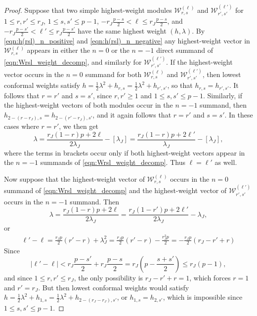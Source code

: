 \documentclass[11pt, reqno]{amsart}
\theoremstyle{definition}\newtheorem{defi}[thm]{Definition}
\theoremstyle{definition}\newtheorem{rem}[thm]{Remark}
\theoremstyle{definition}\newtheorem{exam}[thm]{Example}
\theoremstyle{definition}\newtheorem{assum}[thm]{Assumption}
\newcommand{\cW}{\mathcal{W}}
\begin{document}
\begin{proof}
Suppose that two simple highest-weight modules $\cW_{r,s}^{(\ell)}$ and $\cW_{r',s'}^{(\ell')}$ for $1\leq r,r'\leq r_J$, $1\leq s,s'\leq p-1$, $-r_J\frac{p-s}{2}<\ell\leq r_J\frac{p-s}{2}$, and $-r_J\frac{p-s'}{2}<\ell'\leq r_J\frac{p-s'}{2}$ have the same highest weight $(h,\lambda)$. By \eqref{eqn:h(rsl)_n_positive} and \eqref{eqn:h(rsl)_n_negative} any highest-weight vector in $\cW_{r,s}^{(\ell)}$ appears in either the $n=0$ or the $n=-1$ direct summand of \eqref{eqn:Wrsl_weight_decomp}, and similarly for $\cW_{r',s'}^{(\ell')}$. If the highest-weight vector occurs in the $n=0$ summand for both $\cW_{r,s}^{(\ell)}$ and $\cW_{r',s'}^{(\ell')}$, then lowest conformal weights satisfy $h=\frac{1}{2}\lambda^2+h_{r,s}=\frac{1}{2}\lambda^2+h_{r',s'}$, so that $h_{r,s}=h_{r',s'}$. It follows that $r=r'$ and $s=s'$, since $r,r'\geq 1$ and $1\leq s,s'\leq p-1$. Similarly, if the highest-weight vectors of both modules occur in the $n=-1$ summand, then $h_{2-(r-r_J),s}=h_{2-(r'-r_J),s'}$, and it again follows that $r=r'$ and $s=s'$. In these cases where $r=r'$, we then get
\begin{equation*}
\lambda =\frac{r_J(1-r)p+2\ell}{2\lambda_J}-[\lambda_J] = \frac{r_J(1-r)p+2\ell'}{\lambda_J}-[\lambda_J],
\end{equation*}
where the terms in brackets occur only if both highest-weight vectors appear in the $n=-1$ summands of \eqref{eqn:Wrsl_weight_decomp}. Thus $\ell=\ell'$ as well.

Now suppose that the highest-weight vector of $\cW_{r,s}^{(\ell)}$ occurs in the $n=0$ summand of \eqref{eqn:Wrsl_weight_decomp} and the highest-weight vector of $\cW_{r',s'}^{(\ell')}$ occurs in the $n=-1$ summand. Then
\begin{equation*}
\lambda=\frac{r_J(1-r)p+2\ell}{2\lambda_J}=\frac{r_J(1-r')p+2\ell'}{2\lambda_J}-\lambda_J,
\end{equation*}
or
\begin{align*}
\ell'-\ell = \frac{r_J p}{2}(r'-r)+\lambda_J^2 =\frac{r_J p}{2}(r'-r) -\frac{r_J^2 p}{2}=-\frac{r_J p}{2}(r_J-r'+r)
\end{align*}
Since
\begin{equation*}
\vert \ell'-\ell\vert < r_J\frac{p-s'}{2}+r_J\frac{p-s}{2} = r_J \left(p-\frac{s+s'}{2}\right)\leq r_J(p-1),
\end{equation*}
and since $1\leq r,r'\leq r_J$, the only possibility is $r_J-r'+r=1$, which forces $r=1$ and $r'=r_J$. But then lowest conformal weights would satisfy $h=\frac{1}{2}\lambda^2+h_{1,s} =\frac{1}{2}\lambda^2 + h_{2-(r_J-r_J),s'}$, or $h_{1,s}=h_{2,s'}$, which is impossible since $1\leq s,s'\leq p-1$.
\end{proof}
\end{document}
